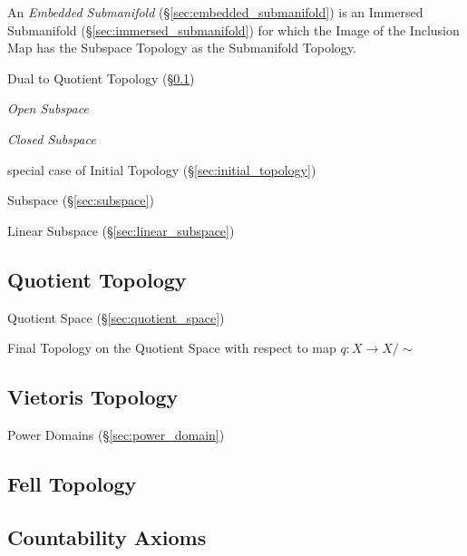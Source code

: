 An \emph{Embedded Submanifold} (\S\ref{sec:embedded_submanifold}) is an
Immersed Submanifold (\S\ref{sec:immersed_submanifold}) for which the Image of
the Inclusion Map has the Subspace Topology as the Submanifold Topology.

Dual to Quotient Topology (\S\ref{sec:quotient_topology})

\emph{Open Subspace}

\emph{Closed Subspace}

special case of Initial Topology (\S\ref{sec:initial_topology})

\fist Subspace (\S\ref{sec:subspace})

\fist Linear Subspace (\S\ref{sec:linear_subspace})



\subsection{Quotient Topology}\label{sec:quotient_topology}

Quotient Space (\S\ref{sec:quotient_space})

Final Topology on the Quotient Space with respect to map $q : X
\rightarrow X / \sim$



\subsection{Vietoris Topology}\label{sec:vietoris_topology}

\fist Power Domains (\S\ref{sec:power_domain})



\subsection{Fell Topology}\label{sec:fell_topology}

\subsection{Countability Axioms}\label{sec:countability_axioms}

